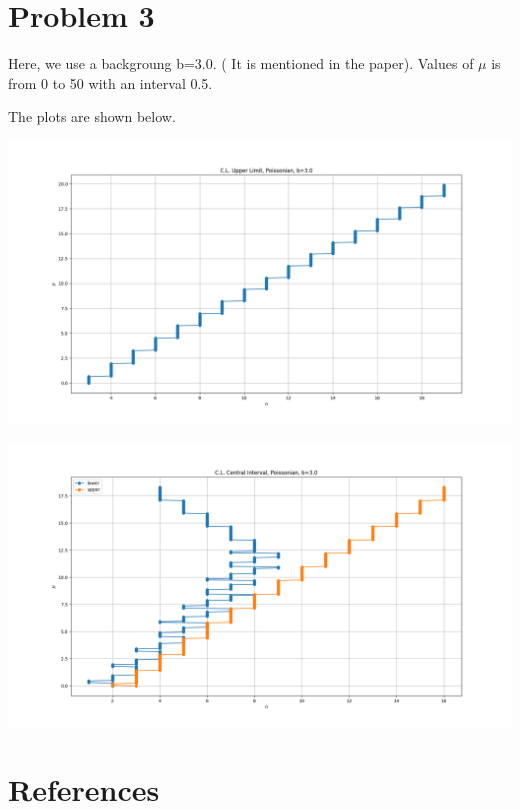 \documentclass[a4paper,11pt]{article}
\begin{document}
\section*{Problem 3}
\label{sec:org311d280}
Here, we use a backgroung b=3.0. ( It is mentioned in the paper). Values of \(\mu\) is from 0 to 50 with an interval 0.5.

The plots are shown below.

\begin{center}
\includegraphics[width=.9\linewidth]{pr3_ul.png}
\end{center}

\begin{center}
\includegraphics[width=.9\linewidth]{pr3_cl.png}
\end{center}

\section*{References}
\label{sec:org46451d5}


\end{document}
